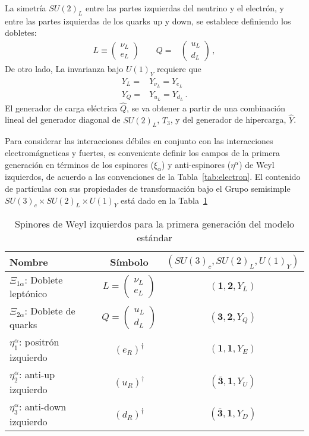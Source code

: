 \begin{frame}
La simetría $SU(2)_L$ entre las partes izquierdas del neutrino y el electrón, y entre las partes izquierdas de los quarks up y down, se establece  definiendo los dobletes:
  \begin{align}
    L\equiv\begin{pmatrix}
      \nu_L\\
      e_L      
    \end{pmatrix}\qquad   Q=&\begin{pmatrix}
    u_L\\
    d_L
  \end{pmatrix}\,,
  \end{align}
De otro lado, La invarianza bajo $U(1)_Y$ requiere que
\begin{align}
  Y_L=&Y_{\nu_L}=Y_{e_L}\nonumber\\
  Y_Q=&Y_{u_L}=Y_{d_L}\,.
\end{align}
El generador de carga eléctrica $\widehat{Q}$, se va obtener a partir de una combinación lineal del generador diagonal de $SU(2)_L$, $T_3$, y del generador de hipercarga, $\widehat{Y}$.

Para considerar las interacciones débiles en conjunto con las interacciones electromágneticas y fuertes, es conveniente definir los campos de la primera generación en términos de los espinores ($\xi_{\alpha}$) y anti-espinores ($\eta^{\alpha}$) de Weyl izquierdos, de acuerdo a las convenciones de la Tabla~\ref{tab:electron}. El contenido de partículas con sus propiedades de transformación bajo el Grupo semisimple $SU(3)_c\times SU(2)_L\times U(1)_Y$ está dado en la Tabla~\ref{tab:fgw}
\begin{table}
  \centering
  \begin{tabular}{l|c|c}\hline
    Nombre & Símbolo & $\left( SU(3)_c, SU(2)_L, U(1)_Y \right)$\\\hline
    $\Xi_{1\alpha}$: Doblete leptónico & $L=\displaystyle{\begin{pmatrix}
      \nu_L\\
      e_L      
    \end{pmatrix}}$ & $\left( \mathbf{1},\mathbf{2},Y_L \right)$\\
    $\Xi_{2\alpha}$: Doblete de quarks & $Q=\displaystyle{\begin{pmatrix}
      u_L\\
      d_L      
    \end{pmatrix}}$ & $\left( \mathbf{3},\mathbf{2},Y_Q \right)$\\
   $\eta^{\alpha}_1$: positrón izquierdo & $\left( e_R \right)^{\dagger}$&$\left(\mathbf{1},\mathbf{1},Y_{E}\right)$ \\
   $\eta^{\alpha}_2$: anti-up izquierdo & $\left( u_R \right)^{\dagger}$&$\left(\overline{\mathbf{3}},\mathbf{1},Y_{U}\right)$ \\
   $\eta^{\alpha}_3$: anti-down izquierdo & $\left( d_R \right)^{\dagger}$&$\left(\overline{\mathbf{3}},\mathbf{1},Y_{D}\right)$ \\
  \end{tabular}
  \caption{Spinores de Weyl izquierdos para la primera generación del modelo estándar}
  \label{tab:fgw}
\end{table}


\end{frame}
